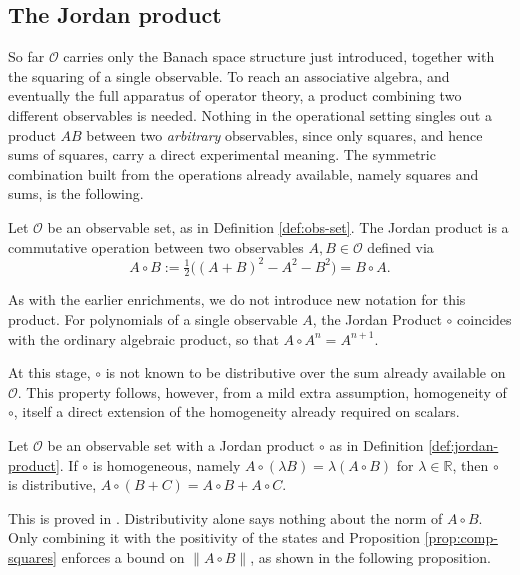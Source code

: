 \subsection*{The Jordan product}

So far $\mathcal{O}$ carries only the Banach space structure just
introduced, together with the squaring of a single observable. To reach
an associative algebra, and eventually the full apparatus of operator theory, a product combining two different observables is needed. Nothing in the operational setting singles out a product $AB$ between two \emph{arbitrary} observables, since only squares, and hence sums of
squares, carry a direct experimental meaning. The symmetric
combination built from the operations already available, namely squares
and sums, is the following.

\begin{definition}
	\label{def:jordan-product}
	Let $\mathcal{O}$ be an observable set, as in Definition \ref{def:obs-set}. The Jordan product is a commutative operation between two observables $A, B \in \mathcal{O}$ defined via
	\[
	A\circ B := \tfrac12\big((A+B)^2-A^2-B^2\big) = B\circ A .
	\]
\end{definition}

\begin{remark}
	As with the earlier enrichments, we do not introduce new notation for
	this product. For polynomials of a single observable $A$, the Jordan Product $\circ$
	coincides with the ordinary algebraic product, so that $A\circ
	A^n=A^{n+1}$.
\end{remark}

At this stage, $\circ$ is not known to be distributive over the sum
already available on $\mathcal{O}$. This property follows, however, from
a mild extra assumption, homogeneity of $\circ$, itself a direct extension
of the homogeneity already required on scalars.

\begin{proposition}
	Let $\mathcal{O}$ be an observable set with a Jordan product $\circ$ as in Definition \ref{def:jordan-product}. If $\circ$ is homogeneous, namely $A\circ(\lambda B)=\lambda(A\circ B)$ for
	$\lambda\in\mathbb{R}$, then $\circ$ is distributive,
	$A\circ(B+C)=A\circ B+A\circ C$.
\end{proposition}

This is proved in \cite[p.20]{strocchiIntroductionMathematicalStructure2005}. Distributivity alone says nothing about the norm of $A\circ B$. Only combining it with the positivity of the states and Proposition \ref{prop:comp-squares} enforces a bound on $\| A\circ B \|$, as shown in the following proposition.

